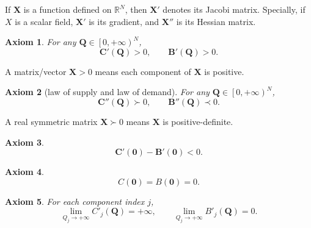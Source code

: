 \documentclass{article}
\newtheorem{axiom}{Axiom}[subsection]
\begin{document}
If $\mathbf X$ is a function defined on $\mathbb R^N$, then $\mathbf X'$ denotes its Jacobi matrix.
Specially, if $X$ is a scalar field, $\mathbf X'$ is its gradient, and $\mathbf X''$ is its Hessian matrix.

\begin{axiom}
\label{multi monoticity}
For any $\mathbf Q\in\left[0,+\infty\right)^N$,
$$\mathbf C'\!\left(\mathbf Q\right)>0,\qquad\mathbf B'\!\left(\mathbf Q\right)>0.$$
\end{axiom}

A matrix/vector $\mathbf X>0$ means each component of $\mathbf X$ is positive.

\begin{axiom}[law of supply and law of demand]
\label{multi law of supply and law of demand}
For any $\mathbf Q\in\left[0,+\infty\right)^N$,
$$\mathbf C''\!\left(\mathbf Q\right)\succ0,\qquad\mathbf B''\!\left(\mathbf Q\right)\prec0.$$
\end{axiom}

A real symmetric matrix $\mathbf X\succ0$ means $\mathbf X$ is positive-definite.

\begin{axiom}
$$\mathbf C'\!\left(\mathbf0\right)-\mathbf B'\!\left(\mathbf0\right)<0.$$
\end{axiom}

\begin{axiom}
$$C\!\left(\mathbf0\right)=B\!\left(\mathbf0\right)=0.$$
\end{axiom}

\begin{axiom}
For each component index $j$,
$$\lim_{Q_j\to+\infty}C'_j\!\left(\mathbf Q\right)=+\infty,
\qquad\lim_{Q_j\to+\infty}B'_j\!\left(\mathbf Q\right)=0.$$
\end{axiom}
\end{document}
